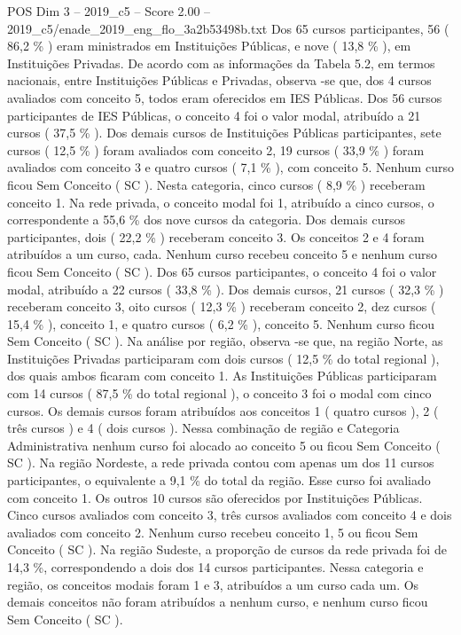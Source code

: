 \begin{textsample}{POS Dim 3 – 2019\_c5 – Score 2.00 – 2019\_c5/enade\_2019\_eng\_flo\_3a2b53498b.txt}
Dos 65 cursos participantes, 56 ( 86,2 \% ) eram ministrados em Instituições Públicas, e nove ( 13,8 \% ), em Instituições Privadas.
De acordo com as informações da Tabela 5.2, em termos nacionais, entre Instituições Públicas e Privadas, observa -se que, dos 4 cursos avaliados com conceito 5, todos eram oferecidos em IES Públicas.
Dos 56 cursos participantes de IES Públicas, o conceito 4 foi o valor modal, atribuído a 21 cursos ( 37,5 \% ).
Dos demais cursos de Instituições Públicas participantes, sete cursos ( 12,5 \% ) foram avaliados com conceito 2, 19 cursos ( 33,9 \% ) foram avaliados com conceito 3 e quatro cursos ( 7,1 \% ), com conceito 5.
Nenhum curso ficou Sem Conceito ( SC ).
Nesta categoria, cinco cursos ( 8,9 \% ) receberam conceito 1.
Na rede privada, o conceito modal foi 1, atribuído a cinco cursos, o correspondente a 55,6 \% dos nove cursos da categoria.
Dos demais cursos participantes, dois ( 22,2 \% ) receberam conceito 3.
Os conceitos 2 e 4 foram atribuídos a um curso, cada.
Nenhum curso recebeu conceito 5 e nenhum curso ficou Sem Conceito ( SC ).
Dos 65 cursos participantes, o conceito 4 foi o valor modal, atribuído a 22 cursos ( 33,8 \% ).
Dos demais cursos, 21 cursos ( 32,3 \% ) receberam conceito 3, oito cursos ( 12,3 \% ) receberam conceito 2, dez cursos ( 15,4 \% ), conceito 1, e quatro cursos ( 6,2 \% ), conceito 5.
Nenhum curso ficou Sem Conceito ( SC ).
Na análise por região, observa -se que, na região Norte, as Instituições Privadas participaram com dois cursos ( 12,5 \% do total regional ), dos quais ambos ficaram com conceito 1.
As Instituições Públicas participaram com 14 cursos ( 87,5 \% do total regional ), o conceito 3 foi o modal com cinco cursos.
Os demais cursos foram atribuídos aos conceitos 1 ( quatro cursos ), 2 ( três cursos ) e 4 ( dois cursos ).
Nessa combinação de região e Categoria Administrativa nenhum curso foi alocado ao conceito 5 ou ficou Sem Conceito ( SC ).
Na região Nordeste, a rede privada contou com apenas um dos 11 cursos participantes, o equivalente a 9,1 \% do total da região.
Esse curso foi avaliado com conceito 1.
Os outros 10 cursos são oferecidos por Instituições Públicas.
Cinco cursos avaliados com conceito 3, três cursos avaliados com conceito 4 e dois avaliados com conceito 2.
Nenhum curso recebeu conceito 1, 5 ou ficou Sem Conceito ( SC ).
Na região Sudeste, a proporção de cursos da rede privada foi de 14,3 \%, correspondendo a dois dos 14 cursos participantes.
Nessa categoria e região, os conceitos modais foram 1 e 3, atribuídos a um curso cada um.
Os demais conceitos não foram atribuídos a nenhum curso, e nenhum curso ficou Sem Conceito ( SC ).

\end{textsample}
